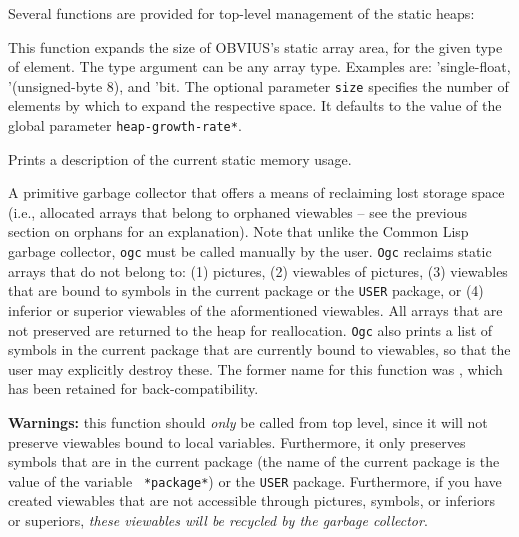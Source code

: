 Several functions are provided for top-level management of the static
heaps:
\begin{description}

\item{}
This function expands the size of OBVIUS's static array area, for the
given type of element.  The type argument can be any array type.
Examples are: 'single-float, '(unsigned-byte 8), and 'bit.  The
optional parameter {\tt size} specifies the number of elements by
which to expand the respective space.  It defaults to the value of the
global parameter {\tt *heap-growth-rate*}.

\item{}
Prints a description of the current static memory usage.

\item{}
A primitive garbage collector that offers a means of reclaiming lost
storage space (i.e., allocated arrays that belong to orphaned 
viewables -- see the previous section on orphans for an explanation).
Note that unlike the Common Lisp garbage collector, {\tt ogc} must be
called manually by the user.  {\tt Ogc} reclaims static arrays that do
not belong to: (1) pictures, (2) viewables of pictures, (3) viewables
that are bound to symbols in the current package or the {\tt USER}
package, or (4) inferior or superior viewables of the aformentioned
viewables.  All arrays that are not preserved are returned to the heap
for reallocation.  {\tt Ogc} also prints a list of symbols in the
current package that are currently bound to viewables, so that the
user may explicitly destroy these.  The former name for this
function was , which has been retained for
back-compatibility.

{\bf Warnings:} this function should {\em only} be called from top
level, since it will not preserve viewables bound to local variables.
Furthermore, it only preserves symbols that are in the current package
(the name of the current package is the value of the variable {\tt
*package*}) or the {\tt USER} package.  Furthermore, if you have
created viewables that are not accessible through pictures, symbols,
or inferiors or superiors, {\em these viewables will be recycled by
the garbage collector}. 

\end{description}


